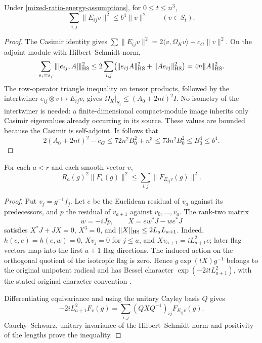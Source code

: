 \begin{lemma}\label{mixed-ratio-energy}
Under \eqref{mixed-ratio-energy-assumptions}, for $0\le t\le n^3$,
\[
                  \sum_{i,j}\|E_{ij}v\|^2\le b^4\|v\|^2
                         \qquad(v\in S_t).
\]
\end{lemma}
\begin{proof}
The Casimir identity gives
$\sum\|E_{ij}v\|^2=2\langle v,\Omega_Kv\rangle-c_G\|v\|^2$.
On the adjoint module with Hilbert--Schmidt norm,
\[
 \sum_{s_i=s_j}\|[e_{ij},A]\|_{\rm HS}^2
 \le2\sum_{i,j}\bigl(\|e_{ij}A\|_{\rm HS}^2+
                     \|Ae_{ij}\|_{\rm HS}^2\bigr)
 =4n\|A\|_{\rm HS}^2.
\]
The row-operator triangle inequality on tensor products, followed by
the intertwiner $e_{ij}\otimes v\mapsto E_{ij}v$, gives
$\Omega_K|_{S_t}\le(A_0+2nt)^2I$.  No isometry of the intertwiner is
needed: a finite-dimensional compact-module image inherits only
Casimir eigenvalues already occurring in its source.  These values
are bounded because the Casimir is self-adjoint.  It follows that
\[
 2(A_0+2nt)^2-c_G
 \le72n^2B_0^2+n^3\le73n^2B_0^2\le B_0^4\le b^4.
\]
\end{proof}

\begin{lemma}\label{mixed-ratio-pointwise}
For each $a<r$ and each smooth vector $v$,
\[
              R_a(g)^2\|F_v(g)\|^2
                         \le\sum_{i,j}\|F_{E_{ij}v}(g)\|^2.
\]
\end{lemma}
\begin{proof}
Put $v_j=g^{-1}f_j$.  Let $e$ be the Euclidean residual of $v_a$
against its predecessors, and $p$ the residual of $v_{a+1}$ against
$v_0,\ldots,v_a$.  The rank-two matrix
\[
                 w=-iJp,\qquad X=e w^*J-w e^*J
\]
satisfies $X^*J+JX=0$, $X^3=0$, and
$\|X\|_{\rm HS}\le2L_aL_{a+1}$.  Indeed,
$h(e,e)=h(e,w)=0$, $Xv_j=0$ for $j\le a$, and
$Xv_{a+1}=iL_{a+1}^2e$; later flag vectors map into the first
$a+1$ flag directions.  The induced action on the orthogonal quotient
of the isotropic flag is zero.  Hence $g\exp(tX)g^{-1}$ belongs to
the original unipotent radical and has Bessel character
$\exp(-2itL_{a+1}^2)$, with the stated original character convention
\cite{mixed-ratio-source}.

Differentiating equivariance and using the unitary Cayley basis $Q$
gives
\[
 -2iL_{a+1}^2F_v(g)
                   =\sum_{i,j}(QXQ^{-1})_{ij}F_{E_{ij}v}(g).
\]
Cauchy--Schwarz, unitary invariance of the Hilbert--Schmidt norm and
positivity of the lengths prove the inequality.
\end{proof}

